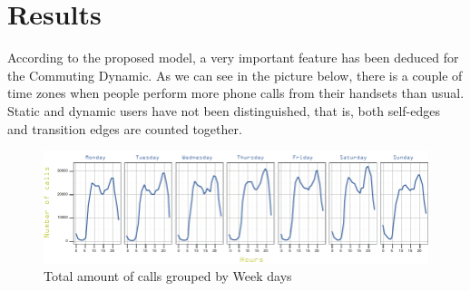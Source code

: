 \newpage
\section{Results}

According to the proposed model, a very important feature has been deduced for the Commuting Dynamic. As we can see in the picture below, there is a couple of time zones when people perform more phone calls from their handsets than usual. Static and dynamic users have not been distinguished, that is, both self-edges and transition edges are counted together.

\begin{figure}[h]
\begin{center}
\includegraphics[scale =1.1] {results/images/calls_number.pdf}
\caption{Total amount of calls grouped by Week days}
\label{fig:count_calls}
\end{center}
\end{figure}


